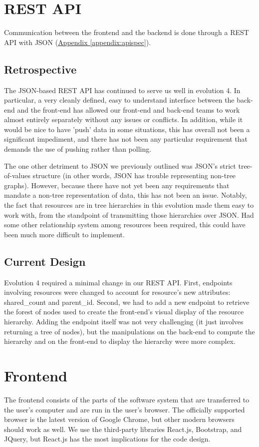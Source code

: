 \documentclass[12pt]{article}
\begin{document}
\section{REST API}
\label{sec:REST}
Communication between the frontend and the backend is done through a REST API with JSON (\hyperref[appendix:apispec]{Appendix \ref{appendix:apispec}}).

\subsection{Retrospective}
The JSON-based REST API has continued to serve us well in evolution 4. In particular, a very cleanly defined, easy to understand interface between the back-end and the front-end has allowed our front-end and back-end teams to work almost entirely separately without any issues or conflicts. In addition, while it would be nice to have 'push' data in some situations, this has overall not been a significant impediment, and there has not been any particular requirement that demands the use of pushing rather than polling. 

The one other detriment to JSON we previously outlined was JSON's strict tree-of-values structure (in other words, JSON has trouble representing non-tree graphs). However, because there have not yet been any requirements that mandate a non-tree representation of data, this has not been an issue. Notably, the fact that resources are in tree hierarchies in this evolution made them easy to work with, from the standpoint of transmitting those hierarchies over JSON. Had some other relationship system among resources been required, this could have been much more difficult to implement. 

\subsection{Current Design}
Evolution 4 required a minimal change in our REST API. First, endpoints involving resources were changed to account for resource's new attributes: shared_count and parent_id. Second, we had to add a new endpoint to retrieve the forest of nodes used to create the front-end's visual display of the resource hierarchy. Adding the endpoint itself was not very challenging (it just involves returning a tree of nodes), but the manipulations on the back-end to compute the hierarchy and on the front-end to display the hierarchy were more complex. 


\section{Frontend}
\label{sec:Frontend}
The frontend consists of the parts of the software system that are transferred to the user's computer and are run in the user's browser. The officially supported browser is the latest version of Google Chrome, but other modern browsers should work as well. We use the third-party libraries React.js, Bootstrap, and JQuery, but React.js has the most implications for the code design.
\end{document}
